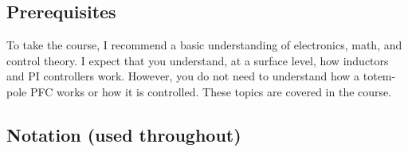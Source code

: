 \documentclass[11pt]{article}
\begin{document}
\hypertarget{prerequisites}{%
\subsection{Prerequisites}\label{prerequisites}}

To take the course, I recommend a basic understanding of electronics,
math, and control theory. I expect that you understand, at a surface
level, how inductors and PI controllers work. However, you do not need
to understand how a totem-pole PFC works or how it is controlled. These
topics are covered in the course.

\hypertarget{notation-used-throughout}{%
\subsection{Notation (used throughout)}\label{notation-used-throughout}}
\end{document}
